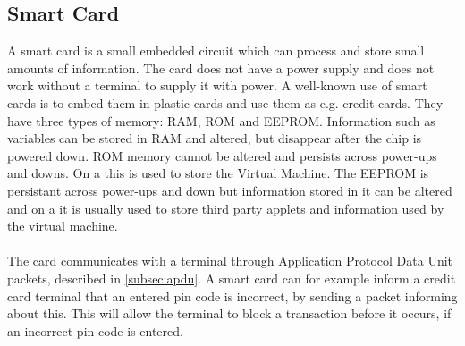 \subsection{Smart Card}
A smart card is a small embedded circuit which can process and store small amounts of information. The card does not have a power supply and does not work without a terminal to supply it with power. A well-known use of smart cards is to embed them in plastic cards and use them as e.g. credit cards. They have three types of memory: RAM, ROM and EEPROM. Information such as variables can be stored in RAM and altered, but disappear after the chip is powered down. ROM memory cannot be altered and persists across power-ups and downs. On a \jc this is used to store the \jc Virtual Machine. The EEPROM is persistant across power-ups and down but information stored in it can be altered and on a \jc it is usually used to store third party applets and information used by the virtual machine.\\\\
The card communicates with a terminal through Application Protocol Data Unit packets, described in \cref{subsec:apdu}. A smart card can for example inform a credit card terminal that an entered pin code is incorrect, by sending a packet informing about this. This will allow the terminal to block a transaction before it occurs, if an incorrect pin code is entered.